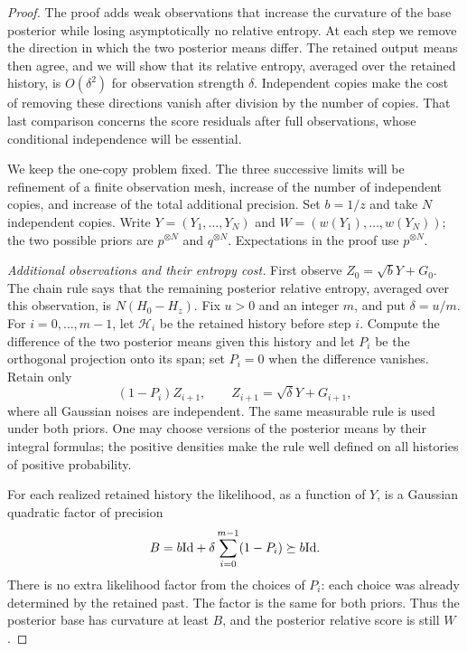 \begin{proof}
The proof adds weak observations that increase the curvature of the
base posterior while losing asymptotically no relative entropy.
At each step we remove the direction in which the two posterior means
differ. The retained output means then agree, and we will show that
its relative entropy, averaged over the retained history, is
$O(\delta^2)$ for observation strength $\delta$.
Independent copies make the cost of removing these directions vanish
after division by the number of copies. That last comparison concerns
the score residuals after full observations, whose conditional
independence will be essential.

We keep the one-copy problem fixed. The three successive limits will
be refinement of a finite observation mesh, increase of the number of
independent copies, and increase of the total additional precision.
Set $b=1/z$ and take $N$ independent
copies.  Write $Y=(Y_1,\ldots,Y_N)$ and
$W=(w(Y_1),\ldots,w(Y_N))$; the two possible priors are $p^{\otimes N}$
and $q^{\otimes N}$.  Expectations in the proof use $p^{\otimes N}$.

\emph{Additional observations and their entropy cost.}
First observe $Z_0=\sqrt bY+G_0$.  The chain rule says that the
remaining posterior relative entropy, averaged over this observation,
is $N(H_0-H_z)$.  Fix $u>0$ and an integer $m$, and put $\delta=u/m$.
For $i=0,\ldots,m-1$, let $\mathcal H_i$ be the retained history before
step $i$.  Compute the difference of the two posterior means given
this history and let $P_i$ be the orthogonal projection onto its span;
set $P_i=0$ when the difference vanishes.  Retain only
\[
 (1-P_i)Z_{i+1},\qquad Z_{i+1}=\sqrt\delta Y+G_{i+1},
\]
where all Gaussian noises are independent.  The same measurable rule
is used under both priors.  One may choose versions of the posterior
means by their integral formulas; the positive densities make the rule
well defined on all histories of positive probability.

For each realized retained history the likelihood, as a function of
$Y$, is a Gaussian quadratic factor of precision
\begin{equation}
 B=b\mathrm{Id}+\delta\sum_{i=0}^{m-1}(1-P_i)\succeq b\mathrm{Id}.
 \label{eq:entropy-loss-precision}
\end{equation}
There is no extra likelihood factor from the choices of $P_i$: each
choice was already determined by the retained past.  The factor is the
same for both priors.  Thus the posterior base has curvature at least
$B$, and the posterior relative score is still $W$.


\end{proof}
